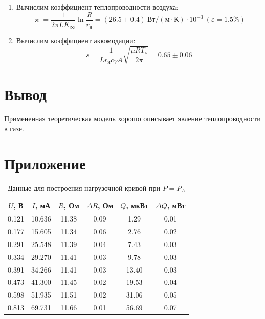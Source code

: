 \documentclass[12pt]{article}
\begin{document}
\begin{enumerate}
            \item Вычислим коэффициент теплопроводности воздуха:
            $$
            \varkappa = \frac{1}{2\pi LK_{\infty}}\ln{\frac{R}{r_{\text{н}}}} = (26.5\pm0.4)\ \text{Вт}/(\text{м}\cdot\text{К})\cdot10^{-3} \ (\varepsilon = 1.5\%)
            $$

            \item Вычислим коэффициент аккомодации:
            $$
            s = \frac{1}{Lr_{\text{н}}c_VA}\sqrt{\frac{\mu RT_{\text{к}}}{2\pi}} = 0.65\pm0.06
            $$

        \end{enumerate}
    \section{Вывод}
    Примененная теоретическая модель хорошо описывает явление теплопроводности в газе.

    \section{Приложение}
    \begin{table}[h]
        \centering
        \caption{Данные для построения нагрузочной кривой при $P = P_A$}
        \label{tab:load}
        \begin{tabular}{|c|c|c|c|c|c|}
        \hline
            $U$, В &  $I$, мА &     $R$, Ом & $\Delta R$, Ом &     $Q$, мкВт & $\Delta Q$, мВт \\ \hline
        0.121 & 10.636 & 11.38 &           0.09 &  1.29 &            0.01 \\ \hline
        0.177 & 15.605 & 11.34 &           0.06 &  2.76 &            0.02 \\ \hline
        0.291 & 25.548 & 11.39 &           0.04 &  7.43 &            0.03 \\ \hline
        0.334 & 29.270 & 11.41 &           0.03 &  9.78 &            0.03 \\ \hline
        0.391 & 34.266 & 11.41 &           0.03 & 13.40 &            0.03 \\ \hline
        0.473 & 41.300 & 11.45 &           0.02 & 19.53 &            0.04 \\ \hline
        0.598 & 51.935 & 11.51 &           0.02 & 31.06 &            0.05 \\ \hline
        0.813 & 69.731 & 11.66 &           0.01 & 56.69 &            0.07 \\ \hline
        \end{tabular}
    \end{table}
\end{document}
